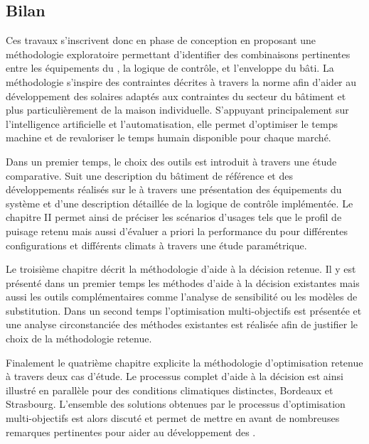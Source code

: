 \subsection{Bilan} %
\label{sub:bilan_methode}
Ces travaux s’inscrivent donc en phase de conception en proposant une méthodologie
exploratoire permettant d’identifier des combinaisons pertinentes entre les équipements du
, la logique de contrôle, et l’enveloppe du bâti. La méthodologie s’inspire des
contraintes décrites à travers la norme  afin d’aider au développement
des  solaires adaptés aux contraintes du secteur du bâtiment et plus
particulièrement de la maison individuelle. S’appuyant principalement sur
l’intelligence artificielle et l’automatisation, elle permet d’optimiser le temps machine
et de revaloriser le temps humain disponible pour chaque marché.

Dans un premier temps, le choix des outils est introduit à travers une étude comparative.
Suit une description du bâtiment de référence et des développements réalisés sur le
 à travers une présentation des équipements du système et d’une description détaillée
de la logique de contrôle implémentée. Le chapitre II permet ainsi de préciser
les scénarios d’usages tels que le profil de puisage retenu mais aussi d’évaluer
a priori la performance du  pour différentes configurations et différents climats
à travers une étude paramétrique.

Le troisième chapitre décrit la méthodologie d’aide à la décision retenue. Il y est
présenté dans un premier temps les méthodes d’aide à la décision existantes mais
aussi les outils complémentaires comme l’analyse de sensibilité ou les modèles
de substitution. Dans un second temps l’optimisation multi-objectifs est présentée
et une analyse circonstanciée des méthodes existantes est réalisée afin de justifier
le choix de la méthodologie retenue.

Finalement le quatrième chapitre explicite la méthodologie d’optimisation retenue à
travers deux cas d’étude. Le processus complet d’aide à la décision est ainsi illustré
en parallèle pour des conditions climatiques distinctes, Bordeaux et Strasbourg. L’ensemble
des solutions obtenues par le processus d’optimisation multi-objectifs est alors discuté
et permet de mettre en avant de nombreuses remarques pertinentes pour aider au développement
des .
